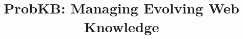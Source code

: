 \documentclass{vldb}
\begin{document}

\title{ProbKB: Managing Evolving Web Knowledge}



%
%
%
%

\end{document}
